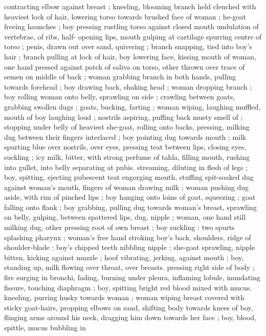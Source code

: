 contracting elbow against breast ; kneeling, blooming branch held 
clenched with heaviest lock of hair, lowering torso towards brushed 
face of woman ; he-goat freeing haunches ; boy pressing rustling 
torso against closed mouth {\col} undulation of vertebrae, of ribs, half- 
opening lips, mouth gulping at cartilage spurring centre of torso ; 
penis, drawn out over sand, quivering ; branch snapping, tied into 
boy's hair ; branch pulling at lock of hair, boy lowering face, kissing 
mouth of woman, one hand pressed against patch of saliva on torso, 
other thrown over trace of semen on middle of back ; woman 
grabbing branch in both hands, pulling towards forehead ; boy 
drawing back, shaking head ; woman dropping branch ; boy rolling 
woman onto belly, sprawling on side ; crawling between goats, 
grabbing swollen dugs ; goats, bucking, farting ; woman wiping, 
laughing muffled, mouth of boy laughing loud ; nostrils aspiring, 
puffing back musty smell of  ; stopping under belly of heaviest 
she-goat, rolling onto backs, pressing, milking dug between their 
fingers interlaced ; boy pointing dug towards mouth ; milk spurting 
blue over nostrils, over eyes, pressing teat between lips, closing 
eyes, suckling ; icy milk, bitter, with strong perfume of tahla, filling 
mouth, rushing into gullet, into belly {\col} separating at pubis. 
streaming, diluting in flesh of legs ; boy, spitting, ejecting pubescent 
teat engorging mouth, stuffing spit-soaked dug against woman's 
mouth, fingers of woman drawing milk ; woman pushing dug aside, 
with rim of pinched lips ; boy hanging onto loins of goat, squeezing 
; goat falling onto flank ; boy grabbing, pulling dug towards woman's 
breast, sprawling on belly, gulping, between spattered lips, dug. 
nipple ; woman, one hand still milking dug, other pressing root of 
own breast ; boy suckling : two spurts splashing pharynx ; woman's 
free hand stroking boy's back, shoulders, ridge of shoulder-blade : 
boy's chipped teeth nibbling nipple ; she-goat sprawling, nipple 
bitten, kicking against muzzle ; hoof vibrating, jerking, against 
mouth ; boy, standing up, milk flowing over throat, over breasts. 
pressing right side of body ; fire surging in bronchi, fading, burning 
under pleura, inflaming lobule, inundating fissure, touching 
diaphragm ; boy, spitting bright red blood mixed with mucus. 
kneeling, purring husky towards woman ; woman wiping breast 
covered with sticky goat-hairs, propping elbows on sand, shifting 
body towards knees of boy, flinging arms around his neck, dragging 
him down towards her face ; boy, blood, spittle, mucus bubbling in 
